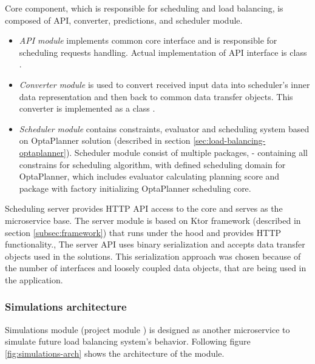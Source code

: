 Core component, 
which is responsible for scheduling and load balancing,
is composed of API, converter, predictions, and scheduler module.
\begin{itemize}
    \item \textit{API module} implements common core interface  
    and is responsible for scheduling requests handling.
    Actual implementation of API interface is class .
    \item \textit{Converter module} is used to convert received input data into scheduler's inner data representation and then back to common data transfer objects. 
    This converter is implemented as a class .
    \item \textit{Scheduler module} contains constraints, evaluator and scheduling system based on OptaPlanner solution
    (described in section \ref{sec:load-balancing-optaplanner}).
    Scheduler module consist of multiple packages, 
     - containing all constrains for scheduling algorithm,
     with defined scheduling domain for OptaPlanner,
     which includes evaluator calculating planning score
    and  package with factory initializing OptaPlanner scheduling core.
\end{itemize}

Scheduling server provides HTTP API access to the core
and serves as the microservice base.
The server module is based on Ktor framework (described in section \ref{subsec:framework})
that runs under the hood and provides HTTP functionality.,
The server API uses binary serialization and accepts data transfer objects used in the solutions.
This serialization approach was chosen because of the number of interfaces and loosely coupled data objects,
that are being used in the application.

\subsubsection{Simulations architecture}\label{subsec:simulations-architecture}
Simulations module (project module ) is designed as another microservice to simulate future load balancing system's behavior.
Following figure \ref{fig:simulations-arch} shows the architecture of the module.  


